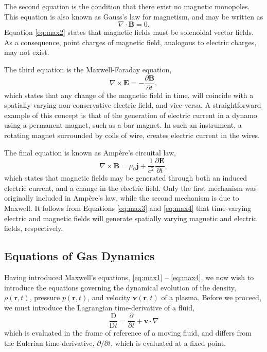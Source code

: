 The second equation is the condition that there exist no magnetic monopoles.
This equation is also known as Gauss's law for magnetism, and may be written as
%
\begin{equation}
\label{eq:max2}
\nabla \cdot \mathbf B = 0.
\end{equation}
%
Equation \eqref{eq:max2} states that magnetic fields must be solenoidal vector fields.
As a consequence, point charges of magnetic field, analogous to electric charges, may not exist.

The third equation is the Maxwell-Faraday equation,
%
\begin{equation}
\label{eq:max3}
\nabla \times \mathbf E = - \frac{\partial \mathbf B}{\partial t},
\end{equation}
%
which states that any change of the magnetic field in time, will coincide with a spatially varying non-conservative electric field, and vice-versa.
A straightforward example of this concept is that of the generation of electric current in a dynamo using a permanent magnet, such as a bar magnet.
In such an instrument, a rotating magnet surrounded by coils of wire, creates electric current in the wires.

The final equation is known as Amp\`ere's circuital law,
%
\begin{equation}
\label{eq:max4}
\nabla \times \mathbf B = \mu_0 \mathbf j + \frac{1}{c^2} \frac{\partial \mathbf E}{\partial t},
\end{equation}
%
which states that magnetic fields may be generated through both an induced electric current, and a change in the electric field.
Only the first mechanism was originally included in Amp\`ere's law, while the second mechanism is due to Maxwell.
It follows from Equations \eqref{eq:max3} and \eqref{eq:max4} that time-varying electric and magnetic fields will generate spatially varying magnetic and electric fields, respectively.

\subsection{Equations of Gas Dynamics}
\label{subsec:gas}

Having introduced Maxwell's equations, \eqref{eq:max1} -- \eqref{eq:max4}, we now wish to introduce the equations governing the dynamical evolution of the density, $\rho(\mathbf{r}, t)$, pressure $p(\mathbf{r}, t)$, and velocity $\mathbf{v}(\mathbf{r}, t)$ of a plasma.
Before we proceed, we must introduce the Lagrangian time-derivative of a fluid,
%
\begin{equation}
\label{eq:lagder1}
\frac{\mathrm{D}}{\mathrm{D} t} = \frac{\partial}{\partial t} + \mathbf{v} \cdot \nabla
\end{equation}
%
which is evaluated in the frame of reference of a moving fluid, and differs from the Eulerian time-derivative, $\partial / \partial t$, which is evaluated at a fixed point.


